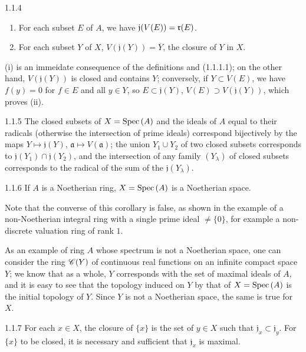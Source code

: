 \begin{envs}[Proposition]{1.1.4}
\label{prop-1.1.1.4}
\begin{enumerate}[label=\rm{(\roman*)}]
  \item For each subset $E$ of $A$, we have $\mathfrak{j}(V(E))=\mathfrak{r}(E)$.
  \item For each subset $Y$ of $X$, $V(\mathfrak{j}(Y))=\overline{Y}$, the closure of $Y$
        in $X$.
\end{enumerate}
\end{envs}
(i) is an immeidate consequence of the definitions and (1.1.1.1); on the other hand,
$V(\mathfrak{j}(Y))$ is closed and contains $Y$; conversely, if $Y\subset V(E)$, we have
$f(y)=0$ for $f\in E$ and all $y\in Y$, so $E\subset\mathfrak{j}(Y)$,
$V(E)\supset V(\mathfrak{j}(Y))$, which proves (ii).

\begin{envs}[Corollary]{1.1.5}
\label{cor-1.1.1.5}
The closed subsets of $X={\mathop{\mathrm{Spec}}\nolimits}\,(A)$ and the ideals of $A$ equal to their radicals (otherwise
the intersection of prime ideals) correspond bijectively by the  maps
$Y\mapsto\mathfrak{j}(Y)$, $\mathfrak{a}\mapsto V(\mathfrak{a})$; the union $Y_1\cup Y_2$ of
two closed subsets corresponds to $\mathfrak{j}(Y_1)\cap\mathfrak{j}(Y_2)$, and the
intersection of any family $(Y_\lambda)$ of closed subsets corresponds to the radical of the
sum of the $\mathfrak{j}(Y_\lambda)$.
\end{envs}

\begin{envs}[Corollary]{1.1.6}
\label{cor-1.1.1.6}
If $A$ is a Noetherian ring, $X={\mathop{\mathrm{Spec}}\nolimits}\,(A)$ is a Noetherian space.
\end{envs}

Note that the converse of this corollary is false, as shown
in the example of a non-Noetherian integral ring with a single prime ideal $\neq\{0\}$, for
example a non-discrete valuation ring of rank $1$.

As an example of ring $A$ whose spectrum is not a Noetherian space, one can consider the ring
$\mathscr{C}(Y)$ of continuous real functions on an infinite compact space $Y$; we know that as a
whole, $Y$ corresponds with the set of maximal ideals of $A$, and it is easy to see that the
topology induced on $Y$ by that of $X={\mathop{\mathrm{Spec}}\nolimits}\,(A)$ is the initial topology of $Y$. Since $Y$ is
not a Noetherian space, the same is true for $X$.

\begin{envs}[Corollary]{1.1.7}
\label{cor-1.1.1.7}
For each $x\in X$, the closure of $\{x\}$ is the set of $y\in X$ such that
$\mathfrak{j}_x\subset\mathfrak{j}_y$. For $\{x\}$ to be closed, it is necessary and
sufficient that $\mathfrak{j}_x$ is maximal.
\end{envs}

